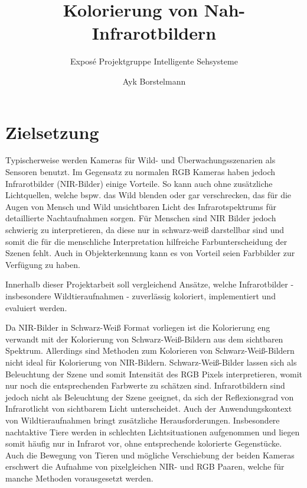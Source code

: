 \documentclass[runningheads]{llncs}
\begin{document}
\title{Kolorierung von Nah-Infrarotbildern}
\subtitle{Exposé Projektgruppe Intelligente Sehsysteme}
\author{Ayk Borstelmann}
\maketitle
%
%
%
\section{Zielsetzung}
Typischerweise werden Kameras für Wild- und Überwachungsszenarien als Sensoren benutzt.
Im Gegensatz zu normalen RGB Kameras haben jedoch Infrarotbilder (NIR-Bilder) einige Vorteile. 
So kann auch ohne zusätzliche Lichtquellen, welche bspw. das Wild blenden oder gar verschrecken, 
das für die Augen von Mensch und Wild unsichtbaren Licht des Infrarotspektrums für detaillierte Nachtaufnahmen sorgen. 
Für Menschen sind NIR Bilder jedoch schwierig zu interpretieren, da diese nur in schwarz-weiß darstellbar sind und 
somit die für die menschliche Interpretation hilfreiche Farbunterscheidung der Szenen fehlt. 
Auch in Objekterkennung kann es von Vorteil seien Farbbilder zur Verfügung zu haben.

Innerhalb dieser Projektarbeit soll vergleichend Ansätze, welche Infrarotbilder - insbesondere Wildtieraufnahmen - zuverlässig koloriert, implementiert und evaluiert werden. 

Da NIR-Bilder in Schwarz-Weiß Format vorliegen ist die Kolorierung eng verwandt mit der Kolorierung von Schwarz-Weiß-Bildern aus dem sichtbaren Spektrum.
Allerdings sind Methoden zum Kolorieren von Schwarz-Weiß-Bildern nicht ideal für Kolorierung von NIR-Bildern. 
Schwarz-Weiß-Bilder lassen sich als Beleuchtung der Szene und somit Intensität des RGB Pixels interpretieren, womit nur noch die entsprechenden Farbwerte zu schätzen sind. 
Infrarotbildern sind jedoch nicht als Beleuchtung der Szene geeignet, da sich der Reflexionsgrad von Infrarotlicht von sichtbarem Licht unterscheidet. 
Auch der Anwendungskontext von Wildtieraufnahmen bringt zusätzliche Herausforderungen. 
Insbesondere nachtaktive Tiere werden in schlechten Lichtsituationen aufgenommen und liegen somit häufig nur in Infrarot vor, ohne entsprechende kolorierte Gegenstücke.
Auch die Bewegung von Tieren und mögliche Verschiebung der beiden Kameras erschwert die Aufnahme von pixelgleichen NIR- und RGB Paaren, welche für manche Methoden vorausgesetzt werden.   
\end{document}

